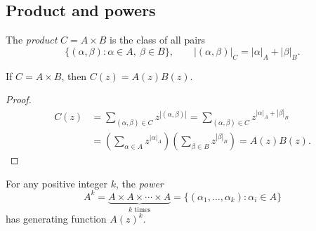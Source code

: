 \subsection{Product and powers}
\begin{definition}
The \textit{product} $C=A\times B$ is the class of all pairs
\[
\{(\alpha,\beta):\alpha\in A,\ \beta\in B\},
\qquad |(\alpha,\beta)|_C=|\alpha|_A+|\beta|_B.
\]
\end{definition}
\begin{lemma}
If $C=A\times B$, then $C(z)=A(z)B(z)$.
\end{lemma}
\begin{proof}
\begin{align*}
C(z)&=\sum_{(\alpha,\beta)\in C}z^{|(\alpha,\beta)|}
=\sum_{(\alpha,\beta)\in C}z^{|\alpha|_A+|\beta|_B}\\
&=\left(\sum_{\alpha\in A}z^{|\alpha|_A}\right)
\left(\sum_{\beta\in B}z^{|\beta|_B}\right)=A(z)B(z).
\end{align*}
\end{proof}
For any positive integer $k$, the \textit{power}
\[
A^k=\underbrace{A\times A\times\cdots\times A}_{k\text{ times}}
=\{(\alpha_1,\ldots,\alpha_k):\alpha_i\in A\}
\]
has generating function $A(z)^k$.

